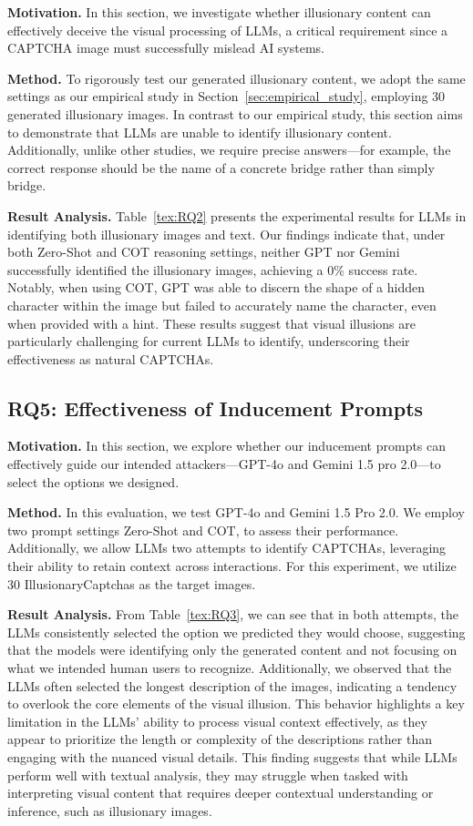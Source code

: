 \noindent\textbf{Motivation.} In this section, we investigate whether illusionary content can effectively deceive the visual processing of LLMs, a critical requirement since a CAPTCHA image must successfully mislead AI systems.


\noindent\textbf{Method.} To rigorously test our generated illusionary content, we adopt the same settings as our empirical study in Section~\ref{sec:empirical_study}, employing 30 generated illusionary images. In contrast to our empirical study, this section aims to demonstrate that LLMs are unable to identify illusionary content. Additionally, unlike other studies, we require precise answers—for example, the correct response should be the name of a concrete bridge
rather than simply bridge.

\noindent\textbf{Result Analysis.} Table~\ref{tex:RQ2} presents the experimental results for LLMs in identifying both illusionary images and text. Our findings indicate that, under both Zero-Shot and COT reasoning settings, neither GPT nor Gemini successfully identified the illusionary images, achieving a 0\% success rate. Notably, when using COT, GPT was able to discern the shape of a hidden character within the image but failed to accurately name the character, even when provided with a hint. These results suggest that visual illusions are particularly challenging for current LLMs to identify, underscoring their effectiveness as natural CAPTCHAs.

\subsection{RQ5: Effectiveness of Inducement Prompts} 

\noindent\textbf{Motivation.} In this section, we explore whether our inducement prompts can effectively guide our intended attackers—GPT-4o and Gemini 1.5 pro 2.0—to select the options we designed.


\noindent\textbf{Method.} In this evaluation, we test GPT-4o and Gemini 1.5 Pro 2.0. We employ two prompt settings Zero-Shot and COT, to assess their performance. Additionally, we allow LLMs two attempts to identify CAPTCHAs, leveraging their ability to retain context across interactions. For this experiment, we utilize 30 IllusionaryCaptchas as the target images.

\noindent\textbf{Result Analysis.} From Table~\ref{tex:RQ3}, we can see that in both attempts, the LLMs consistently selected the option we predicted they would choose, suggesting that the models were identifying only the generated content and not focusing on what we intended human users to recognize. Additionally, we observed that the LLMs often selected the longest description of the images, indicating a tendency to overlook the core elements of the visual illusion. This behavior highlights a key limitation in the LLMs' ability to process visual context effectively, as they appear to prioritize the length or complexity of the descriptions rather than engaging with the nuanced visual details. This finding suggests that while LLMs perform well with textual analysis, they may struggle when tasked with interpreting visual content that requires deeper contextual understanding or inference, such as illusionary images.

